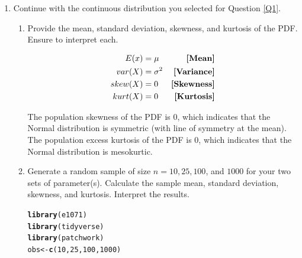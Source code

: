 \documentclass{article}\usepackage[]{graphicx}\usepackage[]{color}
\makeatletter
\newcommand{\hlnum}[1]{\textcolor[rgb]{0.686,0.059,0.569}{#1}}%
\newcommand{\hlstd}[1]{\textcolor[rgb]{0.345,0.345,0.345}{#1}}%
\newcommand{\hlkwb}[1]{\textcolor[rgb]{0.69,0.353,0.396}{#1}}%
\newcommand{\hlkwd}[1]{\textcolor[rgb]{0.737,0.353,0.396}{\textbf{#1}}}%
\newenvironment{kframe}{%
 \def\at@end@of@kframe{}%
 \ifinner\ifhmode%
  \def\at@end@of@kframe{\end{minipage}}%
  \begin{minipage}{\columnwidth}%
 \fi\fi%
 \def\FrameCommand##1{\hskip\@totalleftmargin \hskip-\fboxsep
 \colorbox{shadecolor}{##1}\hskip-\fboxsep
     \hskip-\linewidth \hskip-\@totalleftmargin \hskip\columnwidth}%
 \MakeFramed {\advance\hsize-\width
   \@totalleftmargin\z@ \linewidth\hsize
   \@setminipage}}%
 {\par\unskip\endMakeFramed%
 \at@end@of@kframe}
\newenvironment{knitrout}{}{} %
\makeatother
\begin{document}
\begin{enumerate}
\item Continue with the continuous distribution you selected for Question \ref{Q1}.
\begin{enumerate}
  \item Provide the mean, standard deviation, skewness, and kurtosis of the PDF.
  Ensure to interpret each.
  
\begin{align*}
  E(x) &= \mu &\text{\textbf{[Mean]}}\\
var(X) &= \sigma ^{2} &\text{\textbf{[Variance]}}\\
skew(X) &= 0 &\text{\textbf{[Skewness]}}\\
kurt(X) &= 0 &\text{\textbf{[Kurtosis]}}
\end{align*}

The population skewness of the PDF is 0, which indicates that the Normal distribution is symmetric (with line of symmetry at the mean). The population excess kurtosis of the PDF is 0, which indicates that the Normal distribution is mesokurtic.
  \item Generate a random sample of size $n=10, 25, 100$, and $1000$ for your 
  two sets of parameter(s). Calculate the sample mean, standard deviation, 
  skewness, and kurtosis. Interpret the results.
  
\begin{knitrout}
\color{fgcolor}\begin{kframe}
\begin{alltt}
\hlkwd{library}\hlstd{(e1071)}
\hlkwd{library}\hlstd{(tidyverse)}
\hlkwd{library}\hlstd{(patchwork)}
\hlstd{obs} \hlkwb{<-} \hlkwd{c}\hlstd{(}\hlnum{10}\hlstd{,} \hlnum{25}\hlstd{,} \hlnum{100}\hlstd{,} \hlnum{1000}\hlstd{)}
\end{alltt}
\end{kframe}
\end{knitrout}
  

\end{enumerate}
\end{enumerate}
\end{document}
